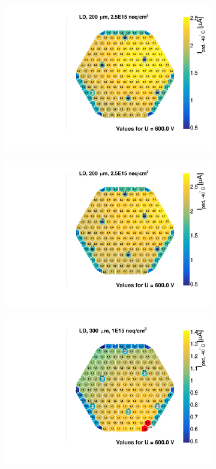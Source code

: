 \begin{figure}
\begin{subfigure}[b]{0.32\textwidth}
		\includegraphics[width=0.999\textwidth]{plots/iv_hexplots/0541_04.pdf}
		\subcaption{
		}
		\label{plot:iv_hexplot_0541_04}
	\end{subfigure}
	\hfill	
	\begin{subfigure}[b]{0.32\textwidth}
		\includegraphics[width=0.999\textwidth]{plots/iv_hexplots/2004.pdf}
		\subcaption{
		}
		\label{plot:iv_hexplot_2004}
	\end{subfigure}
	\hfill
	\begin{subfigure}[b]{0.32\textwidth}
		\includegraphics[width=0.999\textwidth]{plots/iv_hexplots/1013.pdf}

\end{subfigure}
\end{figure}
